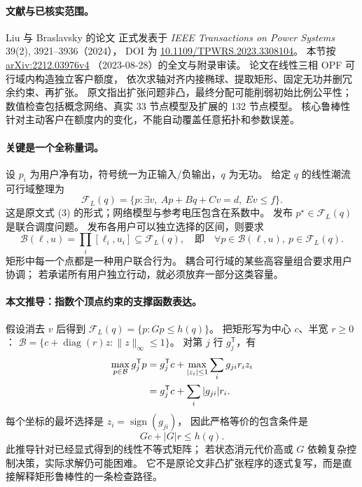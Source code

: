 \paragraph{文献与已核实范围。}
Liu 与 Braslavsky 的论文 \citep{S11} 正式发表于
\emph{IEEE Transactions on Power Systems} 39(2), 3921--3936（2024），
DOI 为 \href{https://doi.org/10.1109/TPWRS.2023.3308104}{10.1109/TPWRS.2023.3308104}。
本节按 \href{https://arxiv.org/html/2212.03976v4}{arXiv:2212.03976v4}
（2023-08-28）的全文与附录审读。
论文在线性三相 OPF 可行域内构造独立客户额度，
依次求轴对齐内接椭球、提取矩形、固定无功并删冗余约束、再扩张。
原文指出扩张问题非凸，最终分配可能削弱初始比例公平性；
数值检查包括概念网络、真实 33 节点模型及扩展的 132 节点模型。
核心鲁棒性针对主动客户在额度内的变化，不能自动覆盖任意拓扑和参数误差。

\paragraph{关键是一个全称量词。}
设 $p_i$ 为用户净有功，符号统一为正输入/负输出，$q$ 为无功。
给定 $q$ 的线性潮流可行域整理为
\begin{equation}
 \mathcal F_L(q)=\{p:\exists v,\ Ap+Bq+Cv=d,\ Ev\leq f\}.
 \label{eq:eng-s11-FL}
\end{equation}
这是原文式 (3) 的形式；网络模型与参考电压包含在系数中。
发布 $p^\star\in\mathcal F_L(q)$ 是联合调度问题。
发布各用户可以独立选择的区间，则要求
\begin{equation}
 \mathcal B(\ell,u)=\prod_i[\ell_i,u_i]\subseteq\mathcal F_L(q),
 \quad\text{即}\quad
 \forall p\in\mathcal B(\ell,u),\ p\in\mathcal F_L(q).
 \label{eq:eng-s11-box}
\end{equation}
矩形中每一个点都是一种用户联合行为。
耦合可行域的某些高容量组合要求用户协调；
若承诺所有用户独立行动，就必须放弃一部分这类容量。

\paragraph{本文推导：指数个顶点约束的支撑函数表达。}
假设消去 $v$ 后得到 $\mathcal F_L(q)=\{p:Gp\leq h(q)\}$。
把矩形写为中心 $c$、半宽 $r\geq0$：
$\mathcal B=\{c+\operatorname{diag}(r)z:\|z\|_\infty\leq1\}$。
对第 $j$ 行 $g_j^{\mathsf T}$，有
\begin{align}
 \max_{p\in\mathcal B}g_j^{\mathsf T}p
 &=g_j^{\mathsf T}c+
   \max_{|z_i|\leq1}\sum_i g_{ji}r_i z_i\notag\\
 &=g_j^{\mathsf T}c+\sum_i|g_{ji}|r_i.
 \label{eq:eng-s11-support-box}
\end{align}
每个坐标的最坏选择是 $z_i=\operatorname{sign}(g_{ji})$，
因此严格等价的包含条件是
\begin{equation}
 Gc+|G|r\leq h(q).
 \label{eq:eng-s11-box-cert}
\end{equation}
此推导针对已经显式得到的线性不等式矩阵；
若状态消元代价高或 $G$ 依赖复杂控制决策，实际求解仍可能困难。
它不是原论文非凸扩张程序的逐式复写，而是直接解释矩形鲁棒性的一条检查路径。

